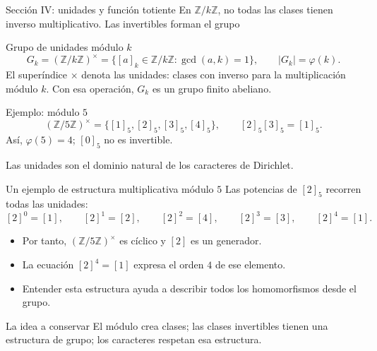 \documentclass[aspectratio=169,11pt]{beamer}
\newcommand{\ZZ}{\mathbb{Z}}
\newcommand{\units}[1]{(\mathbb{Z}/#1\mathbb{Z})^{\times}}
\begin{document}
\begin{frame}{Sección IV: unidades y función totiente}
    En $\ZZ/k\ZZ$, no todas las clases tienen inverso multiplicativo. Las invertibles forman el grupo
    \begin{block}{Grupo de unidades módulo $k$}
        \[
          G_k=(\ZZ/k\ZZ)^\times
          =\{[a]_k\in\ZZ/k\ZZ:\gcd(a,k)=1\},
          \qquad |G_k|=\varphi(k).
        \]
        El superíndice $\times$ denota las unidades: clases con inverso para la multiplicación módulo $k$. Con esa operación, $G_k$ es un grupo finito abeliano.
    \end{block}
    \begin{exampleblock}{Ejemplo: módulo $5$}
        \[
          (\ZZ/5\ZZ)^\times=\{[1]_5,[2]_5,[3]_5,[4]_5\},
          \qquad [2]_5[3]_5=[1]_5.
        \]
        Así, $\varphi(5)=4$; $[0]_5$ no es invertible.
    \end{exampleblock}
    \centering\small Las unidades son el dominio natural de los caracteres de Dirichlet.\;\cite[Capítulo 5]{Apostol1976-xj,Lee2018-aa}
\end{frame}

\begin{frame}{Un ejemplo de estructura multiplicativa módulo $5$}
    Las potencias de $[2]_5$ recorren todas las unidades:
    \[
      [2]^0=[1],\qquad [2]^1=[2],\qquad [2]^2=[4],\qquad [2]^3=[3],\qquad [2]^4=[1].
    \]
    \begin{itemize}
        \item Por tanto, $\units{5}$ es cíclico y $[2]$ es un generador.
        \item La ecuación $[2]^4=[1]$ expresa el orden $4$ de ese elemento.
        \item Entender esta estructura ayuda a describir todos los homomorfismos desde el grupo.
    \end{itemize}
    \begin{alertblock}{La idea a conservar}
        El módulo crea clases; las clases invertibles tienen una estructura de grupo; los caracteres respetan esa estructura.
    \end{alertblock}
\end{frame}
\end{document}
